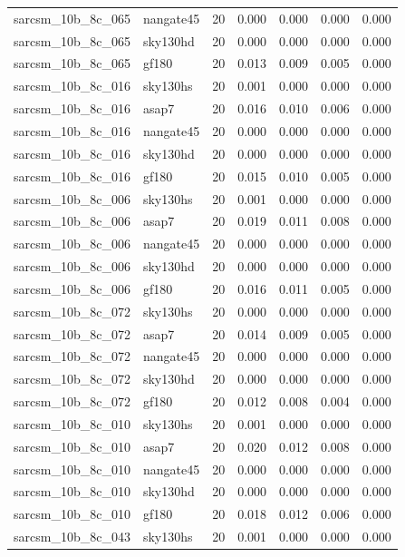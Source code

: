 \begin{tabular}{llrrrrr}
sarcsm\_10b\_8c\_065 & nangate45 & 20 & 0.000 & 0.000 & 0.000 & 0.000 \\
sarcsm\_10b\_8c\_065 & sky130hd & 20 & 0.000 & 0.000 & 0.000 & 0.000 \\
sarcsm\_10b\_8c\_065 & gf180 & 20 & 0.013 & 0.009 & 0.005 & 0.000 \\
sarcsm\_10b\_8c\_016 & sky130hs & 20 & 0.001 & 0.000 & 0.000 & 0.000 \\
sarcsm\_10b\_8c\_016 & asap7 & 20 & 0.016 & 0.010 & 0.006 & 0.000 \\
sarcsm\_10b\_8c\_016 & nangate45 & 20 & 0.000 & 0.000 & 0.000 & 0.000 \\
sarcsm\_10b\_8c\_016 & sky130hd & 20 & 0.000 & 0.000 & 0.000 & 0.000 \\
sarcsm\_10b\_8c\_016 & gf180 & 20 & 0.015 & 0.010 & 0.005 & 0.000 \\
sarcsm\_10b\_8c\_006 & sky130hs & 20 & 0.001 & 0.000 & 0.000 & 0.000 \\
sarcsm\_10b\_8c\_006 & asap7 & 20 & 0.019 & 0.011 & 0.008 & 0.000 \\
sarcsm\_10b\_8c\_006 & nangate45 & 20 & 0.000 & 0.000 & 0.000 & 0.000 \\
sarcsm\_10b\_8c\_006 & sky130hd & 20 & 0.000 & 0.000 & 0.000 & 0.000 \\
sarcsm\_10b\_8c\_006 & gf180 & 20 & 0.016 & 0.011 & 0.005 & 0.000 \\
sarcsm\_10b\_8c\_072 & sky130hs & 20 & 0.000 & 0.000 & 0.000 & 0.000 \\
sarcsm\_10b\_8c\_072 & asap7 & 20 & 0.014 & 0.009 & 0.005 & 0.000 \\
sarcsm\_10b\_8c\_072 & nangate45 & 20 & 0.000 & 0.000 & 0.000 & 0.000 \\
sarcsm\_10b\_8c\_072 & sky130hd & 20 & 0.000 & 0.000 & 0.000 & 0.000 \\
sarcsm\_10b\_8c\_072 & gf180 & 20 & 0.012 & 0.008 & 0.004 & 0.000 \\
sarcsm\_10b\_8c\_010 & sky130hs & 20 & 0.001 & 0.000 & 0.000 & 0.000 \\
sarcsm\_10b\_8c\_010 & asap7 & 20 & 0.020 & 0.012 & 0.008 & 0.000 \\
sarcsm\_10b\_8c\_010 & nangate45 & 20 & 0.000 & 0.000 & 0.000 & 0.000 \\
sarcsm\_10b\_8c\_010 & sky130hd & 20 & 0.000 & 0.000 & 0.000 & 0.000 \\
sarcsm\_10b\_8c\_010 & gf180 & 20 & 0.018 & 0.012 & 0.006 & 0.000 \\
sarcsm\_10b\_8c\_043 & sky130hs & 20 & 0.001 & 0.000 & 0.000 & 0.000 \\

\end{tabular}
